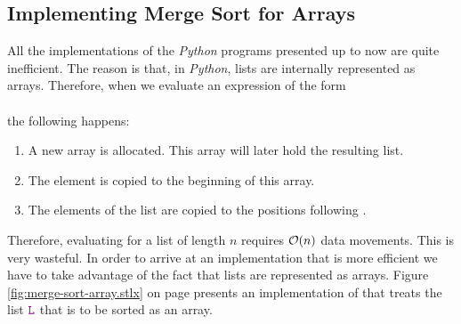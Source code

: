 \subsection{Implementing Merge Sort for Arrays}
All the implementations of the \textsl{Python} programs presented up to now are quite inefficient.  The
reason is that, in \textsl{Python}, lists are internally represented as arrays.  Therefore, when
we evaluate an expression of the form 
\\[0.2cm]
\hspace*{1.3cm}
\\[0.2cm]
the following happens:
\begin{enumerate}
\item A new array is allocated.  This array will later hold the resulting list.
\item The element  is copied to the beginning of this array.
\item The elements of the list  are copied to the positions following .
\end{enumerate}
Therefore, evaluating  for a list  of length $n$ requires $\mathcal{O}(n)$ data
movements.  This is very wasteful.  In order to arrive at an
implementation that is more efficient we have to take advantage of the fact that lists are represented as arrays.
Figure \ref{fig:merge-sort-array.stlx} on page \pageref{fig:merge-sort-array.stlx} presents
an implementation of  that treats the list $\mytt{L}$ that is to be sorted as an array.


